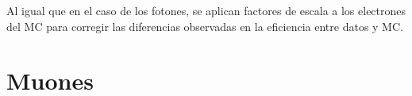 
Al igual que en el caso de los fotones, se aplican factores de escala
a los electrones del MC para corregir las diferencias observadas en la
eficiencia entre datos y MC.

\section{Muones}
\label{sec:muon_obj}


